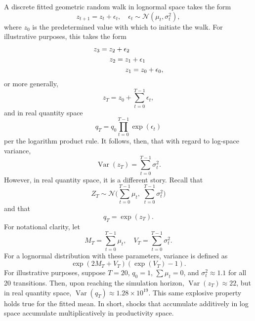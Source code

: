 \documentclass[twocolumn, letterpaper]{article}
\begin{document}
A discrete fitted geometric random walk in lognormal space takes the form
\begin{equation}
    z_{t+1} = z_t + \epsilon_t, \quad \epsilon_t \sim \mathcal{N}(\mu_t,\sigma^2_t),
    \label{eq:basic_fitted_grw}
\end{equation}
where $z_0$ is the predetermined value with which to initiate the walk. For illustrative purposes, this takes the form
\begin{equation}
    \begin{aligned}
        & z_3 = z_2 + \epsilon_2\\
        & \hspace{2.3em} z_2 = z_1 + \epsilon_1 \\
        & \hspace{4.6em} z_1 = z_0 + \epsilon_0,
    \end{aligned} 
    \label{eq:illustrative_ngrw}
\end{equation}
or more generally,
\begin{equation}
    z_T = z_0 + \sum_{t=0}^{T-1} \epsilon_t,
    \label{eq:compact_ngrw_log}
\end{equation}
and in real quantity space
\begin{equation}
    q_T = q_0\prod_{t=0}^{T-1} \exp(\epsilon_t)
    \label{eq:compact_ngrw_real}
\end{equation}
per the logarithm product rule. It follows, then, that with regard to log-space variance,
\begin{equation}
    \operatorname{Var}(z_T) = \sum_{t=0}^{T-1} \sigma^2_t.
    \label{eq:logspace_ngrw_var}
\end{equation}
However, in real quantity space, it is a different story. Recall that
\begin{equation}
    Z_T \sim \mathcal{N}\Big( \sum_{t=0}^{T-1} \mu_t, \;  \sum_{t=0}^{T-1} \sigma^2_t\Big)
    \label{eq:big_zT}
\end{equation}
and that
\begin{equation}
    q_T = \exp(z_T).
    \label{eq:littleexp}
\end{equation}
For notational clarity, let 
\begin{equation}
    M_T = \sum_{t=0}^{T-1} \mu_t, \quad
    V_T = \sum_{t=0}^{T-1} \sigma^2_t.
    \label{eq:mt_vt}
\end{equation}
For a lognormal distribution with these parameters, variance is defined as
\begin{equation}
    \exp(2M_T + V_T)(\exp(V_T)-1).
    \label{eq:lognormalvar}
\end{equation}
For illustrative purposes, suppose $T=20$, $q_0 = 1$, $\sum \mu_t = 0$, and $\sigma^2_t \approx 1.1$ for all 20 transitions. Then, upon reaching the simulation horizon, $\operatorname{Var}(z_T) \approx 22$, but in real quantity space, $\operatorname{Var}(q_T) \approx 1.28 \times 10^19$. This same explosive property holds true for the fitted mean. In short, shocks that accumulate additively in log space accumulate multiplicatively in productivity space. 
\end{document}
